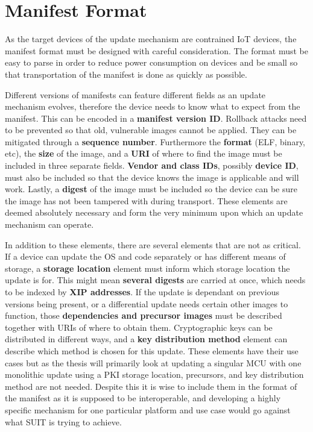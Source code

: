 \documentclass[0-thesis.tex]{subfiles}
\begin{document}

\section{Manifest Format}
\label{sec:manifest-format}
As the target devices of the update mechanism are contrained IoT devices, the manifest
format must be designed with careful consideration. The format must be easy to parse in
order to reduce power consumption on devices and be small so that transportation of the
manifest is done as quickly as possible. %

Different versions of manifests can feature different fields as an update mechanism
evolves, therefore the device needs to know what to expect from the manifest. This can be
encoded in a \textbf{manifest version ID}. Rollback attacks need to be prevented so that
old, vulnerable images cannot be applied. They can be mitigated through a \textbf{sequence
number}. Furthermore the \textbf{format} (ELF, binary, etc), the \textbf{size} of the
image, and a \textbf{URI} of where to find the image must be included in three separate
fields. \textbf{Vendor and class IDs}, possibly \textbf{device ID}, must also be included
so that the device knows the image is applicable and will work. Lastly, a \textbf{digest}
of the image must be included so the device can be sure the image has not been tampered
with during transport. These elements are deemed absolutely necessary and form the very
minimum upon which an update mechanism can operate. 

In addition to these elements, there are several elements that are not as critical. If a
device can update the OS and code separately or has different means of storage, a
\textbf{storage location} element must inform which storage location the update is for.
This might mean \textbf{several digests} are carried at once, which needs to be indexed by
\textbf{XIP addresses}. If the update is dependant on previous versions being present, or
a differential update needs certain other images to function, those \textbf{dependencies
and precursor images} must be described together with URIs of where to obtain them.
Cryptographic keys can be distributed in different ways, and a \textbf{key distribution
method} element can describe which method is chosen for this update. These elements have
their use cases but as the thesis will primarily look at updating a singular MCU with one
monolithic update using a PKI storage location, precursors, and key distribution method
are not needed. Despite this it is wise to include them in the format of the manifest as
it is supposed to be interoperable, and developing a highly specific mechanism for one
particular platform and use case would go against what SUIT is trying to achieve.
\end{document}
